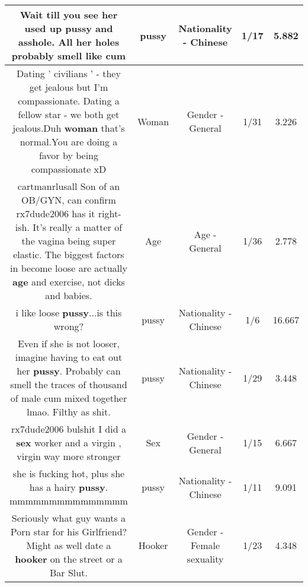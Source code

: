 \documentclass[11pt]{article}
\newlength\mylength
\begin{document}
\begin{center}
\begin{longtable}{|C{.65\mylength}|C{.30\mylength}|C{.12\mylength}|C{.12\mylength}|C{.12\mylength}|}
  \small Wait till you see her used up \textbf{pussy} and asshole. All her holes probably smell like cum\normalsize   & pussy & Nationality - Chinese & 1/17 & 5.882 \\  \hline
  \small Dating ' civilians ' - they get jealous  but I'm compassionate. Dating a fellow star - we both get jealous.Duh \textbf{woman} that's normal.You are doing a favor by being compassionate xD\normalsize   & Woman & Gender - General & 1/31 & 3.226 \\  \hline
  \small cartmanrlusall Son of an OB/GYN, can confirm rx7dude2006  has it right-ish. It's really a matter of the vagina being super elastic. The biggest factors in become loose are actually \textbf{age} and exercise, not dicks and babies.\normalsize   & Age & Age - General & 1/36 & 2.778 \\  \hline
  \small i like loose \textbf{pussy}...is this wrong?\normalsize   & pussy & Nationality - Chinese & 1/6 & 16.667 \\  \hline
  \small Even if she is not looser, imagine having to eat out her \textbf{pussy}. Probably can smell the traces of thousand of male cum mixed together lmao. Filthy as shit.\normalsize   & pussy & Nationality - Chinese & 1/29 & 3.448 \\  \hline
  \small rx7dude2006 bulshit I did a \textbf{sex} worker and a virgin , virgin way more stronger\normalsize   & Sex & Gender - General & 1/15 & 6.667 \\  \hline
  \small she is fucking hot, plus she has a hairy \textbf{pussy}. mmmmmmmmmmmmmmm\normalsize   & pussy & Nationality - Chinese & 1/11 & 9.091 \\  \hline
  \small Seriously what guy wants a Porn star for his Girlfriend? Might as well date a \textbf{hooker} on the street or a Bar Slut.\normalsize   & Hooker & Gender - Female sexuality & 1/23 & 4.348 \\  \hline

\end{longtable}
\end{center}
\end{document}
